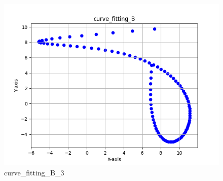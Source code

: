 \documentclass[a4paper]{article}
\begin{document}
\begin{figure}[H] 
    \centering
    \includegraphics{../figure/curve_fitting_B_3.png} 
    \caption{curve\_fitting\_B\_3} 
\end{figure}
\end{document}
